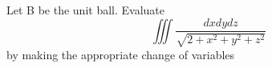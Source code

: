 Let B be the unit ball. Evaluate
$$
\iiint \frac{d x d y d z}{\sqrt{2+x^2+y^2+z^2}}
$$
by making the appropriate change of variables
